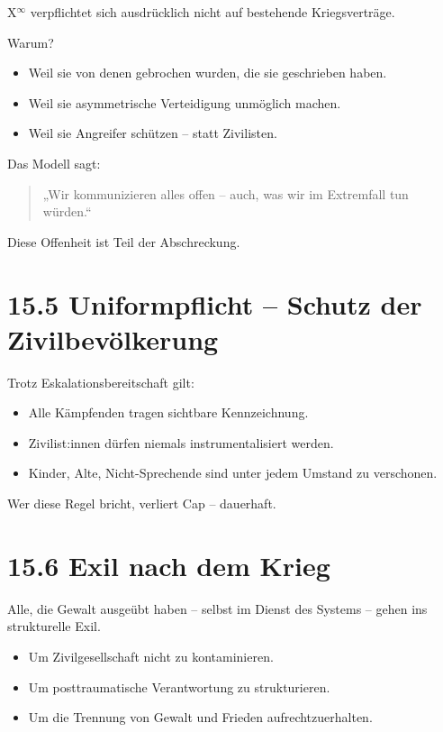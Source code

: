 \documentclass[12pt,a4paper]{book}
\begin{document}
X$^\infty$ verpflichtet sich ausdrücklich nicht auf bestehende Kriegsverträge.

Warum?

\begin{itemize}
    \item Weil sie von denen gebrochen wurden, die sie geschrieben haben.
    \item Weil sie asymmetrische Verteidigung unmöglich machen.
    \item Weil sie Angreifer schützen – statt Zivilisten.
\end{itemize}

Das Modell sagt:

\begin{quote}
„Wir kommunizieren alles offen – auch, was wir im Extremfall tun würden.“  
\end{quote}

Diese Offenheit ist Teil der Abschreckung.

\section*{15.5 Uniformpflicht – Schutz der Zivilbevölkerung}

Trotz Eskalationsbereitschaft gilt:

\begin{itemize}
    \item Alle Kämpfenden tragen sichtbare Kennzeichnung.
    \item Zivilist:innen dürfen niemals instrumentalisiert werden.
    \item Kinder, Alte, Nicht-Sprechende sind unter jedem Umstand zu verschonen.
\end{itemize}

Wer diese Regel bricht, verliert Cap – dauerhaft.

\section*{15.6 Exil nach dem Krieg}

Alle, die Gewalt ausgeübt haben –  
selbst im Dienst des Systems –  
gehen ins strukturelle Exil.

\begin{itemize}
    \item Um Zivilgesellschaft nicht zu kontaminieren.
    \item Um posttraumatische Verantwortung zu strukturieren.
    \item Um die Trennung von Gewalt und Frieden aufrechtzuerhalten.
\end{itemize}
\end{document}
